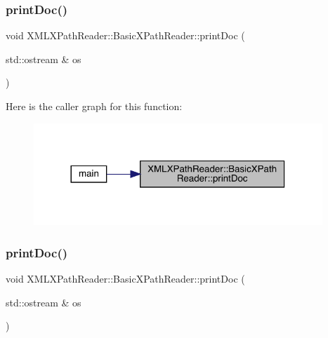 \subsubsection{\texorpdfstring{printDoc()}{printDoc()}\hspace{0.1cm}{\footnotesize\ttfamily [2/3]}}
{\footnotesize\ttfamily void X\+M\+L\+X\+Path\+Reader\+::\+Basic\+X\+Path\+Reader\+::print\+Doc (\begin{DoxyParamCaption}\item[{std\+::ostream \&}]{os }\end{DoxyParamCaption})}

Here is the caller graph for this function\+:
\nopagebreak
\begin{figure}[H]
\begin{center}
\leavevmode
\includegraphics[width=308pt]{d6/dbf/classXMLXPathReader_1_1BasicXPathReader_ab4607adfbae13b0ce3c7e5b944342207_icgraph}
\end{center}
\end{figure}
\mbox{\label{classXMLXPathReader_1_1BasicXPathReader_ab4607adfbae13b0ce3c7e5b944342207}} 
\subsubsection{\texorpdfstring{printDoc()}{printDoc()}\hspace{0.1cm}{\footnotesize\ttfamily [3/3]}}
{\footnotesize\ttfamily void X\+M\+L\+X\+Path\+Reader\+::\+Basic\+X\+Path\+Reader\+::print\+Doc (\begin{DoxyParamCaption}\item[{std\+::ostream \&}]{os }\end{DoxyParamCaption})}

\mbox{\label{classXMLXPathReader_1_1BasicXPathReader_a719ba9bbd4ae77d6be9a6544a2d0ccaf}} 
